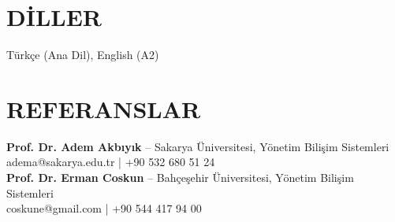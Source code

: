 \documentclass[a4paper,8pt]{article}
\begin{document}
\section{DİLLER}
{\small Türkçe (Ana Dil), English (A2)}

\section{REFERANSLAR}
{\small
\textbf{Prof. Dr. Adem Akbıyık} -- Sakarya Üniversitesi, Yönetim Bilişim Sistemleri\\
adema@sakarya.edu.tr | +90 532 680 51 24\\[3pt]
\textbf{Prof. Dr. Erman Coskun} -- Bahçeşehir Üniversitesi, Yönetim Bilişim Sistemleri\\
coskune@gmail.com | +90 544 417 94 00
}
\end{document}
